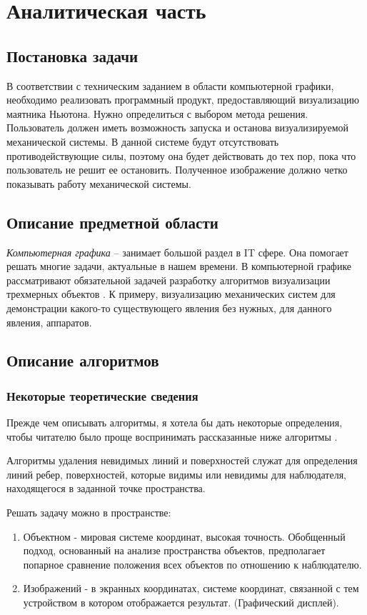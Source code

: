 \chapter{Аналитическая часть}

\section{Постановка задачи}
В соответствии с техническим заданием в области компьютерной графики, необходимо реализовать программный продукт, предоставляющий визуализацию маятника Ньютона. Нужно определиться с выбором метода решения. Пользователь должен иметь возможность запуска и останова визуализируемой механической системы. В данной системе будут отсутствовать противодействующие силы, поэтому она будет действовать до тех пор, пока что пользователь не решит ее остановить. Полученное изображение должно четко показывать работу механической системы.

\section {Описание предметной области}
\textit{Компьютерная графика } -- занимает большой раздел в IT сфере. Она помогает решать многие задачи, актуальные в нашем времени. В компьютерной графике рассматривают обязательной задачей разработку алгоритмов визуализации трехмерных объектов \cite{tr2}. К примеру, визуализацию механических систем для демонстрации какого-то существующего явления без нужных, для данного явления, аппаратов.

\section {Описание алгоритмов}

\subsection {Некоторые теоретические сведения}

Прежде чем описывать алгоритмы, я хотела бы дать некоторые определения, чтобы читателю было проще воспринимать рассказанные ниже алгоритмы \cite{tr2}.

Алгоритмы удаления невидимых линий и поверхностей служат для определения линий ребер, поверхностей, которые видимы или невидимы для наблюдателя, находящегося в заданной точке пространства.

Решать задачу можно в пространстве:
\begin{enumerate}
	\item Объектном - мировая системе координат, высокая точность. Обобщенный подход, основанный на анализе пространства объектов, предполагает попарное сравнение положения всех объектов по отношению к наблюдателю.
	\item Изображений - в экранных координатах, системе координат, связанной с тем устройством в котором отображается результат. (Графический дисплей).
\end{enumerate}

